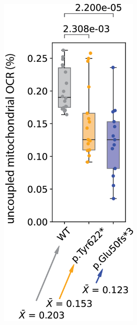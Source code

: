 \begin{figure}[ht]
\begin{subfigure}[t]{.7\textwidth}
\begin{subfigure}[t]{.2\textwidth}
            \includegraphics[width=\textwidth]{./main_plots/uncoupling.png}        

\end{subfigure}
\end{subfigure}
\end{figure}
